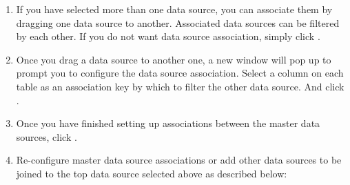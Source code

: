 \documentclass[letterpaper,10pt,english]{sphinxmanual}
\begin{document}
\begin{enumerate}
\begin{quote}
\begin{itemize}
\end{itemize}
\end{quote}

\item {} 
If you have selected more than one data source, you can associate them by dragging one data source to another. Associated data sources can be filtered by each other. If you do not want data source association, simply click .
\begin{quote}

\begin{figure}[H]
\centering

\noindent{}
\end{figure}
\end{quote}

\item {} 
Once you drag a data source to another one, a new window will pop up to prompt you to configure the data source association. Select a column on each table as an association key by which to filter the other data source. And click .
\begin{quote}

\begin{figure}[H]
\centering

\noindent{}
\end{figure}
\end{quote}

\item {} 
Once you have finished setting up associations between the master data sources, click .
\begin{quote}

\begin{figure}[H]
\centering

\noindent{}
\end{figure}
\end{quote}

\item {} 
Re-configure master data source associations or add other data sources to be joined to the top data source selected above as described below:
\begin{quote}

\begin{figure}[H]
\centering

\noindent{}
\end{figure}


\end{quote}
\end{enumerate}
\end{document}
